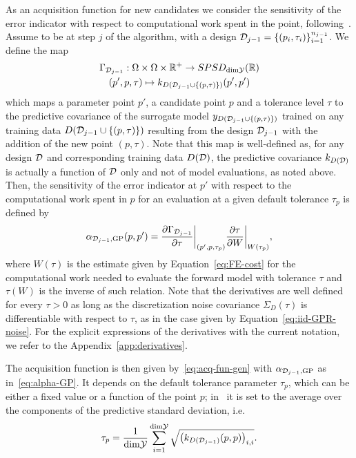 As an acquisition function for new candidates we consider the sensitivity of the error indicator with respect to computational work spent in the point, following~\cite{SemlerWeiser2024,VillaniUngerWeiser2024}.\newline
Assume to be at step $j$ of the algorithm, with a design $\mathcal D_{j-1} = \{ (p_i, \tau_i) \}_{i=1}^{n_{j-1}}$.
We define the map 
\begin{gather*}
    \Gamma_{\mathcal D_{j-1}} : \Omega \times \Omega \times \mathbb{R}^+ \to SPSD_{\text{dim}\mathcal Y}(\mathbb{R}) \\
    (p', p, \tau) \mapsto k_{D(\mathcal D_{j-1} \cup \{(p, \tau)\}) }(p',p')
\end{gather*}
which maps a parameter point $p'$, a candidate point $p$ and a tolerance level $\tau$ to the predictive covariance of the surrogate model $y_{D(\mathcal D_{j-1} \cup \{(p, \tau)\}) }$ trained on any training data $D(\mathcal D_{j-1} \cup \{(p, \tau)\})$  resulting from the design $\mathcal D_{j-1}$ with the addition of the new point $(p, \tau)$.
Note that this map is well-defined as, for any design $\mathcal D$ and corresponding training data $D(\mathcal D)$, the predictive covariance $k_{D(\mathcal D)}$ is actually a function of $\mathcal D$ only and not of model evaluations, as noted above.\newline
Then, the sensitivity of the error indicator at $p'$ with respect to the computational work spent in $p$ for an evaluation at a given default tolerance $\tau_p$ is defined by
\begin{equation} \label{eq:alpha-GP}
    \alpha_{\mathcal D_{j-1}, \text{GP}}(p, p') = \frac{\partial \Gamma_{\mathcal D_{j-1}}}{\partial \tau} \bigg |_{(p',p,\tau_p)} \frac{\partial \tau}{\partial W}\bigg |_{W(\tau_p)},
\end{equation}
where $W(\tau)$ is the estimate given by Equation~\eqref{eq:FE-cost} for the computational work needed to evaluate the forward model with tolerance $\tau$ and $\tau(W)$ is the inverse of such relation. \newline
Note that the derivatives are well defined for every $\tau >0$ as long as the discretization noise covariance $\Sigma_D(\tau)$ is differentiable with respect to $\tau$, as in the case given by Equation~\eqref{eq:iid-GPR-noise}. 
For the explicit expressions of the derivatives with the current notation, we refer to the Appendix~\ref{app:derivatives}.

The acquisition function is then given by~\eqref{eq:acq-fun-gen} with $\alpha_{\mathcal D_{j-1},\text{GP}}$ as in~\eqref{eq:alpha-GP}. 
It depends on the default tolerance parameter $\tau_p$, which can be either a fixed value or a function of the point $p$; in~\cite{VillaniUngerWeiser2024} it is set to the average over the components of the predictive standard deviation, i.e.
\[ \tau_p = \frac{1}{\text{dim}\mathcal Y} \sum_{i=1}^{\text{dim}\mathcal Y} \sqrt{ \big (k_{D(\mathcal D_{j-1})}(p,p) \big )_{i,i}}. \]  \medbreak

